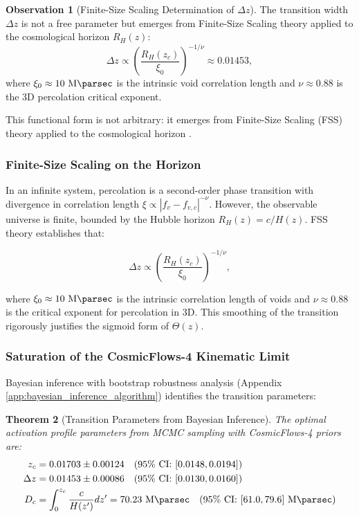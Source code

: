 \documentclass[11pt, a4paper]{article}
\theoremstyle{plain}
\newtheorem{theorem}{Theorem}[section]
\theoremstyle{definition}
\newtheorem{observation}[theorem]{Observation}
\begin{document}
\begin{observation}[Finite-Size Scaling Determination of $\Delta z$]
The transition width $\Delta z$ is not a free parameter but emerges from Finite-Size Scaling theory applied to the cosmological horizon $R_H(z)$:
\begin{equation}
\Delta z \propto \left(\frac{R_H(z_c)}{\xi_0}\right)^{-1/\nu} \approx 0.01453,
\end{equation}
where $\xi_0 \approx 10\ \si{\mega\parsec}$ is the intrinsic void correlation length and $\nu \approx 0.88$ is the 3D percolation critical exponent.
\end{observation}

This functional form is not arbitrary: it emerges from Finite-Size Scaling (FSS) theory applied to the cosmological horizon \cite{Cardy1996}.

\subsubsection{Finite-Size Scaling on the Horizon}

In an infinite system, percolation is a second-order phase transition with divergence in correlation length $\xi \propto |f_v - f_{v,c}|^{-\nu}$. However, the observable universe is finite, bounded by the Hubble horizon $R_H(z) = c/H(z)$. FSS theory establishes that:

\begin{equation}
\Delta z \propto \left(\frac{R_H(z_c)}{\xi_0}\right)^{-1/\nu},
\label{eq:fss_scaling}
\end{equation}

where $\xi_0 \approx 10\ \si{\mega\parsec}$ is the intrinsic correlation length of voids and $\nu \approx 0.88$ is the critical exponent for percolation in 3D. This smoothing of the transition rigorously justifies the sigmoid form of $\Theta(z)$.

\subsubsection{Saturation of the CosmicFlows-4 Kinematic Limit}

Bayesian inference with bootstrap robustness analysis (Appendix \ref{app:bayesian_inference_algorithm}) identifies the transition parameters:

\begin{theorem}[Transition Parameters from Bayesian Inference]
The optimal activation profile parameters from MCMC sampling with CosmicFlows-4 priors are:
\begin{align}
z_c &= 0.01703 \pm 0.00124 \quad (\text{95\% CI: } [0.0148, 0.0194]) \\
\Delta z &= 0.01453 \pm 0.00086 \quad (\text{95\% CI: } [0.0130, 0.0160]) \\
D_c &= \int_0^{z_c} \frac{c}{H(z')} dz' = 70.23\ \si{\mega\parsec} \quad (\text{95\% CI: } [61.0, 79.6]\ \si{\mega\parsec})
\end{align}
\end{theorem}
\end{document}
